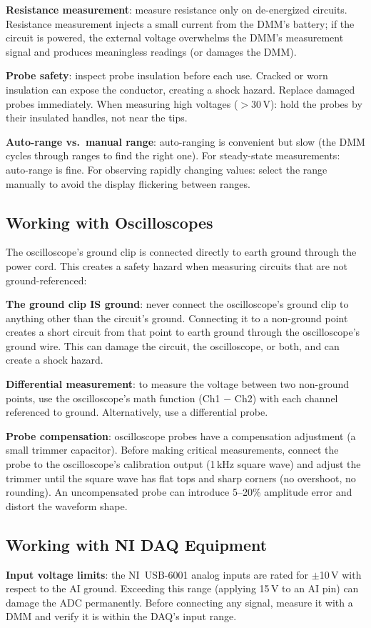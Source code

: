 \documentclass[11pt,letterpaper,twoside,openany]{book}
\begin{document}
\textbf{Resistance measurement}: measure resistance only on de-energized circuits. Resistance measurement injects a small current from the DMM's battery; if the circuit is powered, the external voltage overwhelms the DMM's measurement signal and produces meaningless readings (or damages the DMM).

\textbf{Probe safety}: inspect probe insulation before each use. Cracked or worn insulation can expose the conductor, creating a shock hazard. Replace damaged probes immediately. When measuring high voltages ($>$30\,V): hold the probes by their insulated handles, not near the tips.

\textbf{Auto-range vs.\ manual range}: auto-ranging is convenient but slow (the DMM cycles through ranges to find the right one). For steady-state measurements: auto-range is fine. For observing rapidly changing values: select the range manually to avoid the display flickering between ranges.

\subsection*{Working with Oscilloscopes}
The oscilloscope's ground clip is connected directly to earth ground through the power cord. This creates a safety hazard when measuring circuits that are not ground-referenced:

\textbf{The ground clip IS ground}: never connect the oscilloscope's ground clip to anything other than the circuit's ground. Connecting it to a non-ground point creates a short circuit from that point to earth ground through the oscilloscope's ground wire. This can damage the circuit, the oscilloscope, or both, and can create a shock hazard.

\textbf{Differential measurement}: to measure the voltage between two non-ground points, use the oscilloscope's math function (Ch1 $-$ Ch2) with each channel referenced to ground. Alternatively, use a differential probe.

\textbf{Probe compensation}: oscilloscope probes have a compensation adjustment (a small trimmer capacitor). Before making critical measurements, connect the probe to the oscilloscope's calibration output (1\,kHz square wave) and adjust the trimmer until the square wave has flat tops and sharp corners (no overshoot, no rounding). An uncompensated probe can introduce 5--20\% amplitude error and distort the waveform shape.

\subsection*{Working with NI DAQ Equipment}
\textbf{Input voltage limits}: the NI~USB-6001 analog inputs are rated for $\pm$10\,V with respect to the AI ground. Exceeding this range (applying 15\,V to an AI pin) can damage the ADC permanently. Before connecting any signal, measure it with a DMM and verify it is within the DAQ's input range.
\end{document}

